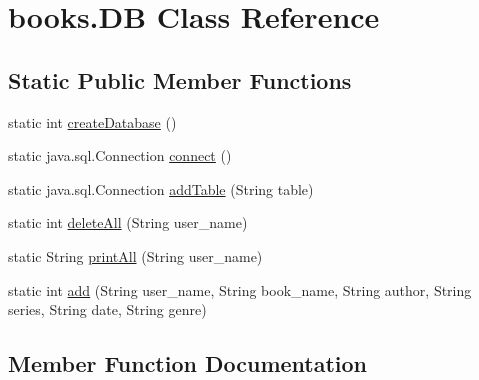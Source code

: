 \hypertarget{classbooks_1_1_d_b}{}\section{books.\+DB Class Reference}
\label{classbooks_1_1_d_b}
\subsection*{Static Public Member Functions}
\begin{DoxyCompactItemize}
\item 
static int \hyperlink{classbooks_1_1_d_b_a40a94e5d04d211dee9aafe54cdcb0791}{create\+Database} ()
\item 
static java.\+sql.\+Connection \hyperlink{classbooks_1_1_d_b_a9ded2a708362453e3dd95d949a8eb91c}{connect} ()
\item 
static java.\+sql.\+Connection \hyperlink{classbooks_1_1_d_b_afb2e7049a5da6cda4903e1422173772c}{add\+Table} (String table)
\item 
static int \hyperlink{classbooks_1_1_d_b_ae00b2da9eadd845bdc7b84b95093cf2d}{delete\+All} (String user\+\_\+name)
\item 
static String \hyperlink{classbooks_1_1_d_b_a5ea1a793f51f76b1cfbcd6f884b88b4e}{print\+All} (String user\+\_\+name)
\item 
static int \hyperlink{classbooks_1_1_d_b_ab97f617eea63a62f85204716df516524}{add} (String user\+\_\+name, String book\+\_\+name, String author, String series, String date, String genre)
\end{DoxyCompactItemize}


\subsection{Member Function Documentation}
